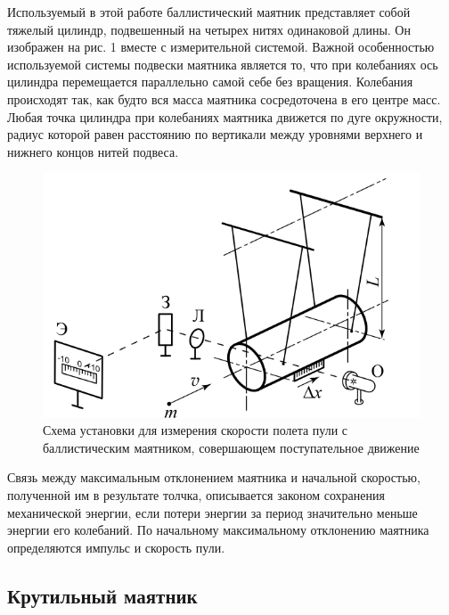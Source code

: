 Используемый в этой работе баллистический маятник представляет собой тяжелый цилиндр, подвешенный на четырех нитях одинаковой длины. Он изображен на рис. 1 вместе с измерительной системой. Важной особенностью используемой системы подвески маятника является то, что при колебаниях ось цилиндра перемещается параллельно самой себе без вращения. Колебания происходят так, как будто вся масса маятника сосредоточена в его центре масс. Любая точка цилиндра при колебаниях маятника движется по дуге окружности, радиус которой равен расстоянию по вертикали между уровнями верхнего и нижнего концов нитей подвеса.

\begin{figure}[H]
    \centering
\includegraphics[width=1.\linewidth,center]{p1.png}
    \caption{Схема установки для измерения скорости полета пули с баллистическим маятником, совершающем поступательное движение}
    \label{fig:my_label}
\end{figure}

Связь между максимальным отклонением маятника и начальной скоростью, полученной им в результате толчка, описывается законом сохранения механической энергии, если потери энергии за период значительно меньше энергии его колебаний. По начальному максимальному отклонению маятника определяются импульс и скорость пули.

\newpage
\subsection{Крутильный маятник}

